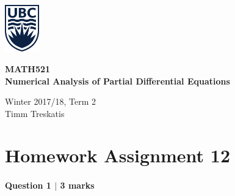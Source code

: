 
\usepackage{amsfonts,amsmath,amssymb,braket,xcolor,enumerate,graphicx}
\usepackage[hidelinks]{hyperref}
\usepackage{listings,multicol,mathtools,textcomp,tikz,pgfplots,wrapfig}
\usepackage[inner=2cm,outer=2cm,top=2cm,bottom=2cm]{geometry}
\usepackage{tabularx}
\usepackage{booktabs}
\usepackage{appendix}
\usepackage{fancyhdr}
\usetikzlibrary{arrows}

\pagestyle{empty}
\setlength{\parindent}{0pt}
\setlength{\parskip}{6pt}

\newcommand{\dx}{\;\mathrm{d}x}
\newcommand{\ds}{\;\mathrm{d}s}



\begin{minipage}{.2\textwidth}
\includegraphics[width=42pt]{ubc-logo.png}
\end{minipage}
\hfill
\begin{minipage}{.75\textwidth}
\setlength{\parskip}{6pt}
\begin{flushright}
{\sffamily
\textbf{MATH521}\\
\textbf{Numerical Analysis of Partial Differential Equations}

Winter 2017/18, Term 2\\
Timm Treskatis
}
\end{flushright}
\end{minipage}

\section*{Homework Assignment 12}


\paragraph*{Question 1 $\vert$ 3 marks}%

